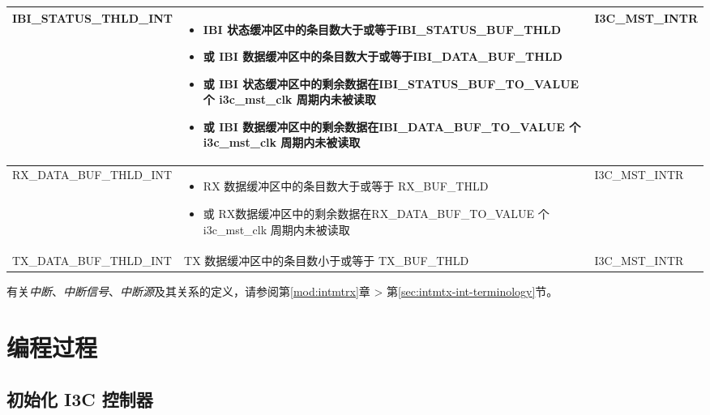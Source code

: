 \documentclass[main\_\_CN.tex]{subfiles}
\begin{document}
\begin{longtable}{ | L{4.5cm} | L{8.5cm} | L{2.5cm} | }
\label{int:IBISTATUSTHLDINT}IBI\_STATUS\_THLD\_INT & \begin{itemize}
    \item IBI 状态缓冲区中的条目数大于或等于IBI\_STATUS\_BUF\_THLD
    \item 或 IBI 数据缓冲区中的条目数大于或等于IBI\_DATA\_BUF\_THLD
    \item 或 IBI 状态缓冲区中的剩余数据在IBI\_STATUS\_BUF\_TO\_VALUE 个 i3c\_mst\_clk 周期内未被读取
    \item 或 IBI 数据缓冲区中的剩余数据在IBI\_DATA\_BUF\_TO\_VALUE 个 i3c\_mst\_clk 周期内未被读取
\end{itemize}
   & I3C\_MST\_INTR \\ \hline
\label{int:RXDATABUFTHLDINT}RX\_DATA\_BUF\_THLD\_INT &  \begin{itemize}
    \item RX 数据缓冲区中的条目数大于或等于 RX\_BUF\_THLD
    \item 或 RX数据缓冲区中的剩余数据在RX\_DATA\_BUF\_TO\_VALUE 个 i3c\_mst\_clk 周期内未被读取
\end{itemize}   & I3C\_MST\_INTR \\ \hline
\label{int:TXDATABUFTHLDINT}TX\_DATA\_BUF\_THLD\_INT & TX 数据缓冲区中的条目数小于或等于 TX\_BUF\_THLD & I3C\_MST\_INTR \\ \hline

\end{longtable}
\begin{tiplisting}
有关\textit{中断}、\textit{中断信号}、\textit{中断源}及其关系的定义，请参阅第\ref{mod:intmtrx}章\textit{} > 第\ref{sec:intmtx-int-terminology}节\textit{}。
\end{tiplisting}


\section{编程过程}
\label{sec:i3c-prog-procedures}
\subsection{初始化 I3C 控制器}
\end{document}
